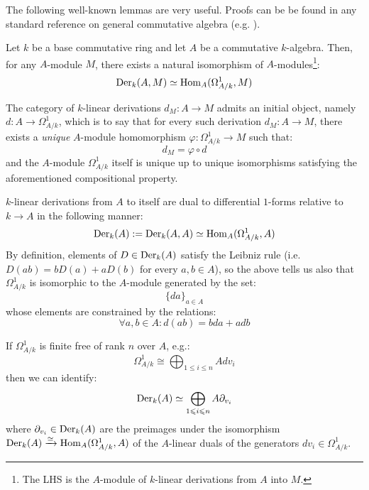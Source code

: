         The following well-known lemmas are very useful. Proofs can be be found in any standard reference on general commutative algebra (e.g. \cite[\href{https://stacks.math.columbia.edu/tag/00AO}{Tag 00AO}]{stacks}).
        \begin{lemma}
            \cite[\href{https://stacks.math.columbia.edu/tag/00RO}{Tag 00RO}]{stacks} Let $k$ be a base commutative ring and let $A$ be a commutative $k$-algebra. Then, for any $A$-module $M$, there exists a natural isomorphism of $A$-modules\footnote{The LHS is the $A$-module of $k$-linear derivations from $A$ into $M$.}:
                $$\mathrm{Der}_k(A, M) \simeq \mathrm{Hom}_A(\Omega^1_{A/k}, M)$$
        \end{lemma}
        \begin{corollary}
            The category of $k$-linear derivations $d_M: A \to M$ admits an initial object, namely $d: A \to \Omega^1_{A/k}$, which is to say that for every such derivation $d_M: A \to M$, there exists a \textit{unique} $A$-module homomorphism $\varphi: \Omega^1_{A/k} \to M$ such that:
                $$d_M = \varphi \circ d$$
            and the $A$-module $\Omega^1_{A/k}$ itself is unique up to unique isomorphisms satisfying the aforementioned compositional property.
        \end{corollary}
        \begin{corollary} \label{coro: 1_forms_are_dual_to_vector_fields}
            $k$-linear derivations from $A$ to itself are dual to differential $1$-forms relative to $k \to A$ in the following manner:
                $$\mathrm{Der}_k(A) := \mathrm{Der}_k(A, A) \simeq \mathrm{Hom}_A(\Omega^1_{A/k}, A)$$
            By definition, elements of $D \in \mathrm{Der}_k(A)$ satisfy the Leibniz rule (i.e. $D(ab) = b D(a) + a D(b)$ for every $a, b \in A$), so the above tells us also that $\Omega^1_{A/k}$ is isomorphic to the $A$-module generated by the set:
                $$\{da\}_{a \in A}$$
            whose elements are constrained by the relations:
                $$\forall a, b \in A: d(ab) = b da + a db$$
        \end{corollary}
        \begin{remark}
            If $\Omega^1_{A/k}$ is finite free of rank $n$ over $A$, e.g.:
                $$\Omega^1_{A/k} \cong \bigoplus_{1 \leq i \leq n} A dv_i$$
            then we can identify:
                $$\mathrm{Der}_k(A) \simeq \bigoplus_{1 \leqslant i \leqslant n} A \partial_{v_i}$$
            where $\partial_{v_i} \in \mathrm{Der}_k(A)$ are the preimages under the isomorphism $\mathrm{Der}_k(A) \xrightarrow[]{\simeq} \mathrm{Hom}_A(\Omega^1_{A/k}, A)$ of the $A$-linear duals of the generators $dv_i \in \Omega^1_{A/k}$. 
        \end{remark}
